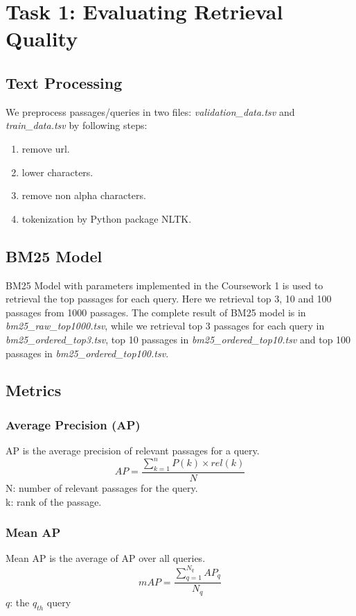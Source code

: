 \section{Task 1: Evaluating Retrieval Quality}

\subsection{Text Processing}
We preprocess passages/queries in two files: \textsl{validation\_data.tsv} and \textsl{train\_data.tsv} by following steps:
\begin{enumerate}
    \item remove url.
    \item lower characters.
    \item remove non alpha characters.
    \item tokenization by Python package NLTK.
\end{enumerate}
\subsection{BM25 Model}
BM25 Model with parameters implemented in the Coursework 1 is used to retrieval the top passages for each query. Here we retrieval top 3, 10 and 100 passages from 1000 passages. The complete result of BM25 model is in \textsl{bm25\_raw\_top1000.tsv}, while we retrieval top 3 passages for each query in \textsl{bm25\_ordered\_top3.tsv}, top 10 passages in \textsl{bm25\_ordered\_top10.tsv} and top 100 passages in \textsl{bm25\_ordered\_top100.tsv}.
\subsection{Metrics}

\subsubsection{Average Precision (AP)}
AP is the average precision of relevant passages for a query.
\begin{equation}
    A P=\frac{\sum_{k=1}^n P(k) \times r e l(k)}{N}
\end{equation}
N: number of relevant passages for the query.\\
k: rank of the passage.
\subsubsection{Mean AP}
Mean AP is the average of AP over all queries.
\begin{equation}
    m A P=\frac{\sum_{q=1}^{N_q} A P_q}{N_q}
\end{equation}
$q$: the $q_{th}$ query
